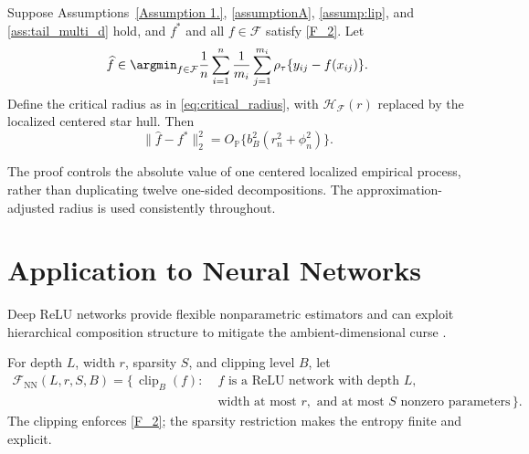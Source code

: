 \documentclass[twoside,11pt]{article}
\newenvironment{revision}{\color{revisionred}}{}
\begin{document}
\begin{theorem}\label{Theorem_non_convex}
\begin{revision}
Suppose Assumptions~\ref{Assumption 1.}, \ref{assumptionA}, \ref{assump:lip}, and \ref{ass:tail_multi_d} hold, and $f^*$ and all $f\in\mathcal F$ satisfy \eqref{F_2}. Let
\begin{equation}
 \widehat f\in\argmin_{f\in\mathcal F}
 \frac1n\sum_{i=1}^n\frac1{m_i}\sum_{j=1}^{m_i}
 \rho_\tau\{y_{ij}-f(x_{ij})\}.                              \label{main_est_nonconvex}
\end{equation}
Define the critical radius as in \eqref{eq:critical_radius}, with $\mathcal H_{\mathcal F}(r)$ replaced by the localized centered star hull. Then
\begin{equation}
 \|\widehat f-f^*\|_2^2
 =O_{\mathbb P}\{b_B^2(r_n^2+\phi_n^2)\}.                    \label{eq:nonconvex_rate_full}
\end{equation}
\end{revision}
\end{theorem}

\begin{revision}
The proof controls the absolute value of one centered localized empirical process, rather than duplicating twelve one-sided decompositions. The approximation-adjusted radius is used consistently throughout.
\end{revision}


\section{Application to Neural Networks}

Deep ReLU networks provide flexible nonparametric estimators and can exploit hierarchical composition structure to mitigate the ambient-dimensional curse \citep{schmidhuber2015deep,schmidt2020nonparametric,kohler2019rate}.

\begin{revision}
For depth $L$, width $r$, sparsity $S$, and clipping level $B$, let
\begin{equation}
\begin{aligned}
 \mathcal F_{\mathrm{NN}}(L,r,S,B)
 =\{\,\operatorname{clip}_B(f):\;&f\text{ is a ReLU network with depth }L,\\
 &\text{width at most }r,\text{ and at most }S\text{ nonzero parameters}\,\}.
\end{aligned}
\label{eq:space_of_networks}
\end{equation}
The clipping enforces \eqref{F_2}; the sparsity restriction makes the entropy finite and explicit.
\end{revision}
\end{document}
